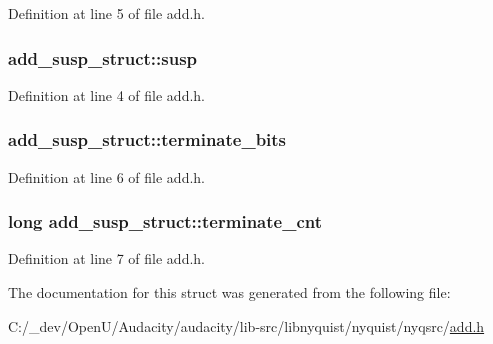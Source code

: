 Definition at line 5 of file add.\+h.

\subsubsection[{\texorpdfstring{susp}{susp}}]{ add\+\_\+susp\+\_\+struct\+::susp}\hypertarget{structadd__susp__struct_a255df2c7ef73db62cc2d14c51b8f900e}{}\label{structadd__susp__struct_a255df2c7ef73db62cc2d14c51b8f900e}


Definition at line 4 of file add.\+h.

\subsubsection[{\texorpdfstring{terminate\+\_\+bits}{terminate_bits}}]{ add\+\_\+susp\+\_\+struct\+::terminate\+\_\+bits}\hypertarget{structadd__susp__struct_a78af50c29188094959163a6c3b623b7c}{}\label{structadd__susp__struct_a78af50c29188094959163a6c3b623b7c}


Definition at line 6 of file add.\+h.

\subsubsection[{\texorpdfstring{terminate\+\_\+cnt}{terminate_cnt}}]{\setlength{\rightskip}{0pt plus 5cm}long add\+\_\+susp\+\_\+struct\+::terminate\+\_\+cnt}\hypertarget{structadd__susp__struct_a33fc23781d8a623c57f4b606f51ee757}{}\label{structadd__susp__struct_a33fc23781d8a623c57f4b606f51ee757}


Definition at line 7 of file add.\+h.



The documentation for this struct was generated from the following file\+:\begin{DoxyCompactItemize}
\item 
C\+:/\+\_\+dev/\+Open\+U/\+Audacity/audacity/lib-\/src/libnyquist/nyquist/nyqsrc/\hyperlink{add_8h}{add.\+h}\end{DoxyCompactItemize}
